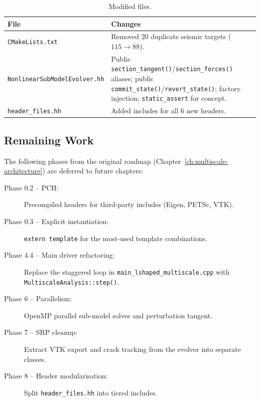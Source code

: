 \begin{table}[htbp]
  \centering
  \caption{Modified files.}
  \label{tab:modified-files}
  \small
  \begin{tabular}{@{}lp{8cm}@{}}
    \toprule
    \textbf{File} & \textbf{Changes} \\
    \midrule
    \texttt{CMakeLists.txt} &
      Removed 20 duplicate seismic targets ($115 \to 88$). \\[3pt]
    \texttt{NonlinearSubModelEvolver.hh} &
      Public \texttt{section\_tangent()}/\texttt{section\_forces()} aliases;
      public \texttt{commit\_state()}/\texttt{revert\_state()};
      factory injection; \texttt{static\_assert} for concept. \\[3pt]
    \texttt{header\_files.hh} &
      Added includes for all 6 new headers. \\
    \bottomrule
  \end{tabular}
\end{table}


\subsection{Remaining Work}
\label{sec:refactor-remaining}

The following phases from the original roadmap
(Chapter~\ref{ch:multiscale-architecture}) are deferred to future
chapters:

\begin{description}
  \item[Phase 0.2 -- PCH:] Precompiled headers for third-party
    includes (Eigen, PETSc, VTK).
  \item[Phase 0.3 -- Explicit instantiation:] \texttt{extern template}
    for the most-used template combinations.
  \item[Phase 4.4 -- Main driver refactoring:]
    Replace the staggered loop in
    \texttt{main\_lshaped\_multiscale.cpp} with
    \texttt{MultiscaleAnalysis::step()}.
  \item[Phase 6 -- Parallelism:] OpenMP parallel sub-model solves
    and perturbation tangent.
  \item[Phase 7 -- SRP cleanup:] Extract VTK export and crack
    tracking from the evolver into separate classes.
  \item[Phase 8 -- Header modularisation:] Split
    \texttt{header\_files.hh} into tiered includes.
\end{description}
